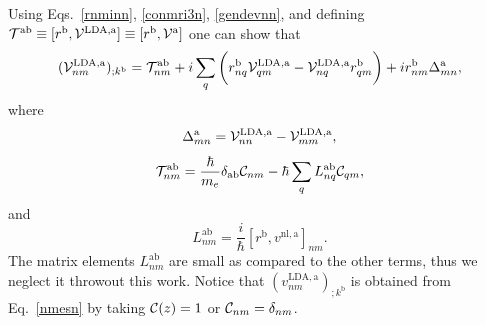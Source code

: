 \documentclass[floatfix,prb,aps,superscriptaddress,showpacs,11pt,preprint,letterpaper]{revtex4}
\begin{document}
Using Eqs.~\eqref{rnminn}, \eqref{conmri3n}, \eqref{gendevnn}, and
defining 
$
{\cal T}^{\mathrm{a}\mathrm{b}}\equiv[r^{\mathrm{b}},{\mathbf{\cal V}}^{\mathrm{LDA},\mathrm{a}}]
\equiv
[r^{\mathrm{b}},{\mathbf{\cal V}}^\mathrm{a}]
$
one can show that
\begin{equation}
({\mathbf{\cal V}}^{\mathrm{LDA},\mathrm{a}}_{nm})_{;k^{\mathrm{b}}}=
{\cal T}_{nm}^{\mathrm{a}\mathrm{b}}
+i
\sum_{q}
\bigg(
r^{\mathrm{b}}_{nq}  
{\mathbf{\cal V}}^{\mathrm{LDA},\mathrm{a}}_{q m}
-
{\mathbf{\cal V}}^{\mathrm{LDA},\mathrm{a}}_{nq}   
r^{\mathrm{b}}_{q m}
\bigg)  
+i  
r^{\mathrm{b}}_{nm}
\Delta^{\mathrm{a}}_{mn}
,
\label{nmesn}
\end{equation}
where
\begin{equation*}
\Delta^{\mathrm{a}}_{mn}
=
{\mathbf{\cal V}}^{\mathrm{LDA},\mathrm{a}}_{nn}  
-
{\mathbf{\cal V}}^{\mathrm{LDA},\mathrm{a}}_{mm}  
,
\end{equation*} 
\begin{equation}
{\cal T}_{nm}^{\mathrm{a}\mathrm{b}}
=
\frac{\hbar}{m_e}\delta_{\mathrm{a}\mathrm{b}} 
{\cal C}_{nm} 
-\hbar 
\sum_q  
L^{\mathrm{a}\mathrm{b}}_{nq} 
{\cal C}_{qm} 
,
\label{tau.1}
\end{equation}   
and
\begin{equation}
L_{nm}^{\mathrm{a}\mathrm{b}}
=\frac{i}{\hbar}[r^{\mathrm{b}},v^{\mathrm{nl},\mathrm{a}}]_{nm}
.
\label{lab}
\end{equation}  
The matrix elements $L^{\mathrm{a}\mathrm{b}}_{nm}$
are small as 
compared to the other terms, thus we neglect it throwout this work.\cite{valerie} 
Notice that
$(v^{\mathrm{LDA},\mathrm{a}}_{nm})_{;k^{\mathrm{b}}}$ is obtained 
from Eq.~\eqref{nmesn} by 
taking 
${\mathbf{\cal C}}(z)=1$ or ${\cal C}_{nm}=\delta_{nm}$.
\end{document}
